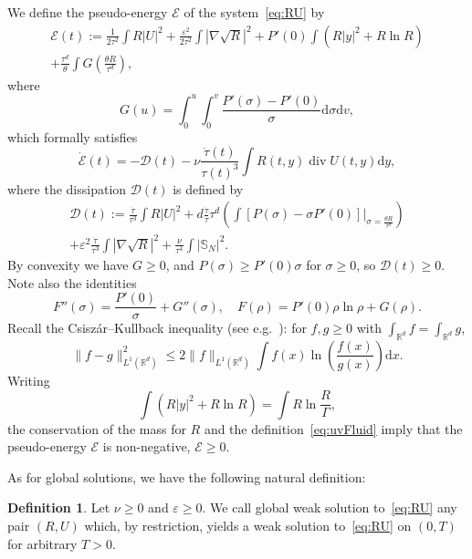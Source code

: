\documentclass[10pt]{amsart}
\theoremstyle{definition}\newtheorem{defi}[theo]{Definition}\newtheorem{rema}[theo]{Remark}\newtheorem{exam}[theo]{Example}\newtheorem{exem}[theo]{Example}\newtheorem{nota}[theo]{Notation}
\DeclareMathOperator{\DIV}{div}
\newcommand*\R{\mathbb{R}}
\newcommand*\dd {\mathrm{d}}
\newcommand*\<{\left\langle}
\renewcommand*\>{\right\rangle}
\renewcommand*\le{\leqslant}
\renewcommand*\ge{\geqslant}
\newcommand*\eps{\varepsilon}
\begin{document}
We define the pseudo-energy $\mathcal E$ of the system~\eqref{eq:RU} by
\begin{multline}\label{eq:pseudo-energy}
\mathcal E(t) := \frac{1}{2\tau^2}\int R|U|^2+\frac{\eps^2}{2\tau^2} \int|\nabla \sqrt R|^2 +P'(0)\int (R |y|^2 + R \ln R) \\
+ \frac{\tau^d}{\theta}\int G\left(\frac{\theta R}{\tau^d}\right),
\end{multline}
where
\begin{equation*}
G(u) =\int_0^u\int_0^v \frac{P'(\sigma)-P'(0)}{\sigma} \dd \sigma \dd v,
\end{equation*}
which formally satisfies
\begin{equation}\label{eq:evol-pseudo}
\dot{\mathcal E}(t) =- \mathcal D(t) - \nu \frac{\dot
\tau(t)}{\tau(t)^3} \int R(t,y) \DIV U(t,y)\dd y,
\end{equation}
where the dissipation $\mathcal D(t) $ is defined by
\begin{multline}\label{eq:dissip-pseudo}
\mathcal D(t) := \frac{\dot \tau}{\tau^3}\int R |U|^2 + d\frac{\dot \tau}{\tau} \tau^d \left(\int \left[P\left(\sigma\right) -\sigma P'(0) \right] \big|_{\sigma= \frac{ \theta R}{\tau^d}} \right) \\
+\eps^2 \frac{\dot \tau}{\tau^3} \int |\nabla \sqrt R|^2 + \frac{\nu}{\tau^4} \int |\mathbb S_N|^2.
\end{multline}
By convexity we have $G\ge 0$, and $P(\sigma)\ge P'(0)\sigma$ for $\sigma\ge 0$, so $\mathcal D(t)\ge 0$. Note also the identities
\begin{equation}\label{eq:FG}
F''(\sigma) = \frac{P'(0)}{\sigma}+G''(\sigma),\quad F(\rho) = P'(0)\rho\ln \rho + G(\rho).
\end{equation}
Recall the Csisz\'ar--Kullback inequality (see e.g.~\cite[Theorem~8.2.7]{LogSob}): for $f,g\ge 0$ with $\int_{\R^d} f=\int_{\R^d} g$,
\begin{equation*}
\|f-g\|_{L^1({\mathbb R}^d)}^2\le 2 \|f\|_{L^1({\mathbb R}^d)}\int f(x)\ln \left(\frac{f(x)}{g(x)}\right) \dd x.
\end{equation*}
Writing
\[
\int (R |y|^2 + R \ln R) = \int R \ln \frac{R}{\Gamma},
\]
the conservation of the mass for $R$ and the definition~\eqref{eq:uvFluid} imply that the pseudo-energy $\mathcal E$ is non-negative, $\mathcal E\ge 0$.

As for global solutions, we have the following natural definition:

\begin{defi}\label{def:sol-globale}
Let $\nu \ge 0$ and $\varepsilon \ge 0.$ We call global weak solution to~\eqref{eq:RU} any pair $(R,U)$ which, by restriction, yields a weak solution to~\eqref{eq:RU} on $(0,T)$ for arbitrary $T>0.$
\end{defi}
\end{document}
